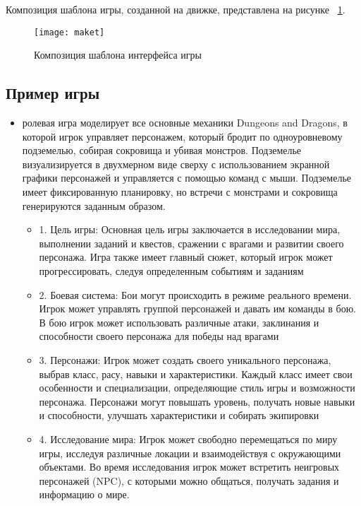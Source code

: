 Композиция шаблона игры, созданной на движке, представлена на рисунке ~\ref{maket:image}.

\begin{figure}[ht]
	\texttt{[image: maket]}
	\caption{Композиция шаблона интерфейса игры}
	\label{maket:image}
\end{figure}

\subsection{Пример игры}
 \begin{itemize}
 	\item ролевая игра моделирует все основные механики Dungeons and Dragons, в которой игрок управляет персонажем, который бродит по одноуровневому подземелью, собирая сокровища и убивая монстров. Подземелье визуализируется в двухмерном виде сверху с использованием экранной графики персонажей и управляется с помощью команд с мыши. Подземелье имеет фиксированную планировку, но встречи с монстрами и сокровища генерируются заданным образом.
 	\begin{itemize}
 		\item 1. Цель игры: Основная цель игры заключается в исследовании мира, выполнении заданий и квестов, сражении с врагами и развитии своего персонажа. Игра также имеет главный сюжет, который игрок может прогрессировать, следуя определенным событиям и заданиям
 		\item 2. Боевая система:  Бои могут происходить в режиме реального времени. Игрок может управлять группой персонажей и давать им команды в бою. В бою игрок может использовать различные атаки, заклинания и способности своего персонажа для победы над врагами
 		\item 3. Персонажи: Игрок может создать своего уникального персонажа, выбрав класс, расу, навыки и характеристики. Каждый класс имеет свои особенности и специализации, определяющие стиль игры и возможности персонажа. Персонажи могут повышать уровень, получать новые навыки и способности, улучшать характеристики и собирать экипировки
 		\item 4. Исследование мира: Игрок может свободно перемещаться по миру игры, исследуя различные локации и взаимодействуя с окружающими объектами. Во время исследования игрок может встретить неигровых персонажей (NPC), с которыми можно общаться, получать задания и информацию о мире.

\end{itemize}
\end{itemize}
